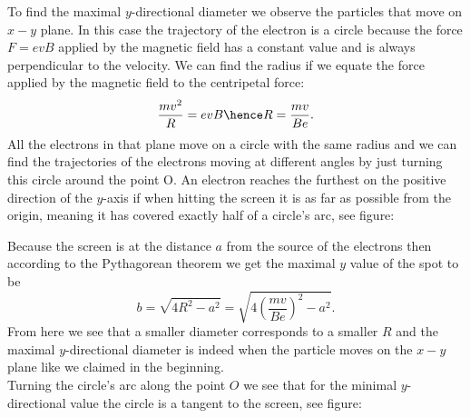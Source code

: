 {\ifEngSolution
To find the maximal $y$-directional diameter we observe the particles that move on $x-y$ plane. In this case the trajectory of the electron is a circle because the force $F=evB$ applied by the magnetic field has a constant value and is always perpendicular to the velocity. We can find the radius if we equate the force applied by the magnetic field to the centripetal force:
$$\frac{mv^2}{R}=evB \hence R = \frac{mv}{Be}.$$
All the electrons in that plane move on a circle with the same radius and we can find the trajectories of the electrons moving at different angles by just turning this circle around the point O. An electron reaches the furthest on the positive direction of the $y$-axis if when hitting the screen it is as far as possible from the origin, meaning it has covered exactly half of a circle’s arc, see figure:
\begin{center}
\end{center}
Because the screen is at the distance $a$ from the source of the electrons then according to the Pythagorean theorem we get the maximal $y$ value of the spot to be 
$$b=\sqrt{4R^2-a^2} = \sqrt{4\left(\frac{mv}{Be}\right)^2-a^2}.$$
From here we see that a smaller diameter corresponds to a smaller $R$ and the maximal $y$-directional diameter is indeed when the particle moves on the $x-y$ plane like we claimed in the beginning.\\
Turning the circle’s arc along the point $O$ we see that for the minimal $y$-directional value the circle is a tangent to the screen, see figure:
\begin{center}
\end{center}}
